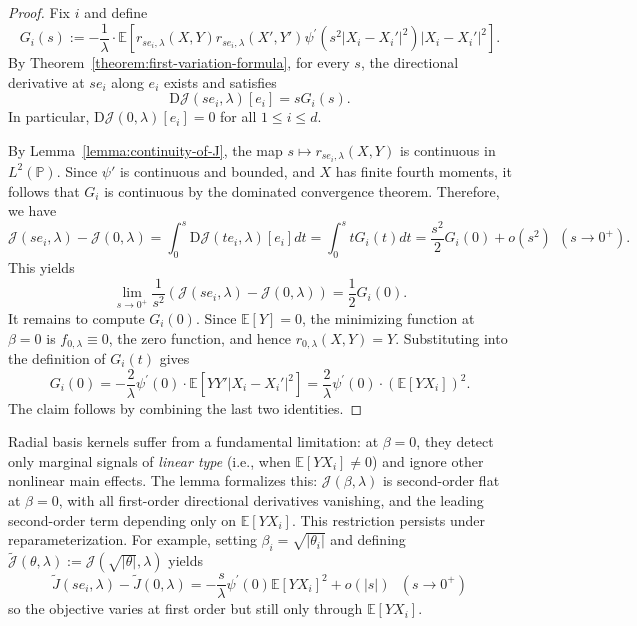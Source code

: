 \documentclass[sn-mathphys-num]{sn-jnl}%
\numberwithin{equation}{section}
\newcommand{\E}{\mathbb{E}}
\renewcommand{\P}{\mathbb{P}}
\newcommand{\half}{\frac{1}{2}}
\newcommand{\profile}{\psi}
\theoremstyle{thmstyleone}%
\theoremstyle{thmstyletwo}%
\theoremstyle{thmstylethree}%
\begin{document}
\begin{proof} 
Fix $i$ and define 
\begin{equation*}
G_i(s):=-\frac{1}{\lambda} \cdot \E[r_{s e_i, \lambda}(X, Y)r_{s e_i, \lambda}(X', Y') \profile^\prime(s^2|X_i - X_i'|^2)|X_i -X_i'|^2].
\end{equation*} 
By Theorem~\ref{theorem:first-variation-formula}, for every $s$, the directional derivative at $s e_i$ along $e_i$ exists and satisfies
\begin{equation*}
\mathrm{D}\mathcal{J}(s e_i, \lambda)[e_i] = s G_i(s).
\end{equation*}
In particular, $\mathrm{D}\mathcal{J}(0, \lambda)[e_i] = 0$ for all $1\le i \le d$. 

By Lemma~\ref{lemma:continuity-of-J}, the map $s \mapsto r_{s e_i, \lambda}(X,Y)$ is continuous in $L^2(\P)$. Since $\profile'$ is continuous 
and bounded, and $X$ has finite fourth moments, it follows that $G_i$ is continuous by the dominated convergence theorem. Therefore, we have
\begin{equation*}
	\mathcal{J}(s e_i, \lambda) - \mathcal{J}(0, \lambda) = \int_0^s \mathrm{D}\mathcal{J}(t e_i, \lambda)[e_i] dt  
		= \int_0^s t G_i(t) dt = \frac{s^2}{2} G_i(0) + o(s^2)~~ (s \to 0^+).
\end{equation*} 
This yields
\begin{equation*}
	\lim_{s \to 0^+} \frac{1}{s^2} \left(\mathcal{J}(s e_i, \lambda) - \mathcal{J}(0, \lambda)\right)  = \half G_i(0).
\end{equation*} 
It remains to compute $G_i(0)$.
Since $\E[Y] = 0$, the minimizing function at $\beta = 0$ is $f_{0, \lambda} \equiv 0$, the zero function, and hence $r_{0, \lambda}(X, Y) = Y$.
Substituting into the definition of $G_i(t)$ gives
\begin{equation*}
	G_i(0) = -\frac{2}{\lambda} \profile^\prime(0) \cdot  \E[YY'|X_i - X_i'|^2] = \frac{2}{\lambda} \profile^\prime(0) \cdot (\E[YX_i])^2.
\end{equation*}
The claim follows by combining the last two identities.
\end{proof} 

Radial basis kernels suffer from a fundamental limitation: at $\beta = 0$, they detect only marginal signals of \emph{linear type} (i.e., when $\E[YX_i] \ne 0$) and ignore other nonlinear main effects. The lemma formalizes this: $\mathcal{J}(\beta,\lambda)$ is second-order flat at $\beta = 0$, with all first-order directional derivatives vanishing, and the leading second-order term depending only on $\E[YX_i]$. This restriction persists under reparameterization. For example, setting $\beta_i = \sqrt{|\theta_i|}$ and defining $\tilde{\mathcal{J}}(\theta, \lambda) := \mathcal{J}(\sqrt{|\theta|}, \lambda)$ yields
\begin{equation*}
	\tilde{J}(se_i, \lambda) -\tilde{J}(0, \lambda) = -\frac{s}{\lambda} \profile^\prime(0) \E[YX_i]^2 + o(|s|)~~~(s \to 0^+)
\end{equation*}
so the objective varies at first order but still only through $\E[YX_i]$.
\end{document}

